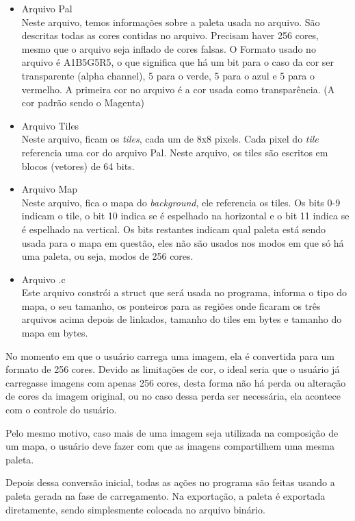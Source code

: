 \documentclass[brazil]{abnt}
\begin{document}
\begin{itemize}
 \item Arquivo Pal\\
 Neste arquivo, temos informações sobre a paleta usada no arquivo. São descritas todas as cores contidas no arquivo. Precisam haver 256 cores, mesmo que o arquivo seja inflado de cores falsas. O Formato usado no arquivo é A1B5G5R5, o que significa que há um bit para o caso da cor ser transparente (alpha channel), 5 para o verde, 5 para o azul e 5 para o vermelho. A primeira cor no arquivo é a cor usada como transparência. (A cor padrão sendo o Magenta)\label{exp:A1B5G5R5}
 \item Arquivo Tiles\\
 Neste arquivo, ficam os \textit{tiles}, cada um de 8x8 pixels. Cada pixel do \textit{tile} referencia uma cor do arquivo Pal. Neste arquivo, os tiles são escritos em blocos (vetores) de 64 bits. 
 \item Arquivo Map\\
 Neste arquivo, fica o mapa do \textit{background}, ele referencia os tiles. Os bits 0-9 indicam o tile, o bit 10 indica se é espelhado na horizontal e o bit 11 indica se é espelhado na vertical. Os bits restantes indicam qual paleta está sendo usada para o mapa em questão, eles não são usados nos modos em que só há uma paleta, ou seja, modos de 256 cores.
 \item Arquivo .c\\
 Este arquivo constrói a struct que será usada no programa, informa o tipo do mapa, o seu tamanho, os ponteiros para as regiões onde ficaram os três arquivos acima depois de linkados, tamanho do tiles em bytes e tamanho do mapa em bytes. 
\end{itemize}

No momento em que o usuário carrega uma imagem, ela é convertida para um formato de 256 cores. Devido as limitações de cor, o ideal seria que o usuário já carregasse imagens com apenas 256 cores, desta forma não há perda ou alteração de cores da imagem original, ou no caso dessa perda ser necessária, ela acontece com o controle do usuário.

Pelo mesmo motivo, caso mais de uma imagem seja utilizada na composição de um mapa, o usuário deve fazer com que as imagens compartilhem uma mesma paleta.

Depois dessa conversão inicial, todas as ações no programa são feitas usando a paleta gerada na fase de carregamento. Na exportação, a paleta é exportada diretamente, sendo simplesmente colocada no arquivo binário.
\end{document}
